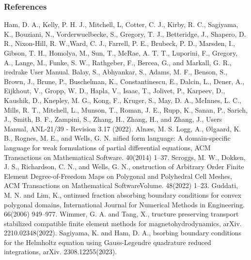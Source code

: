 \documentclass[]{beamer}
\begin{document}
\begin{frame}%
\frametitle{References}
\fontsize{5pt}{5}\selectfont
\begin{thebibliography}{Sagiyam,2013}
Ham, D. A., Kelly, P. H. J., Mitchell, L, Cotter, C. J., Kirby, R. C., Sagiyama, K., Bouziani, N., Vorderwuelbecke, S., Gregory, T. J., Betteridge, J., Shapero, D. R., Nixon-Hill, R. W.,Ward, C. J., Farrell, P. E., Brubeck, P. D., Marsden, I., Gibson, T. H., Homolya, M., Sun, T., McRae, A. T. T., Luporini, F., Gregory, A., Lange, M., Funke, S. W., Rathgeber, F., Bercea, G., and Markall, G. R.,
iredrake {U}ser {M}anual.
Balay, S., Abhyankar, S., Adams, M. F., Benson, S., Brown, J., Brune, P., Buschelman, K., Constantinescu, E., Dalcin, L., Dener, A., Eijkhout, V., Gropp, W. D., Hapla, V., Isaac, T., Jolivet, P., Karpeev, D., Kaushik, D., Knepley, M. G., Kong, F., Kruger, S., May, D. A., McInnes, L. C., Mills, R. T., Mitchell, L., Munson, T., Roman, J. E., Rupp, K., Sanan, P., Sarich, J., Smith, B. F., Zampini, S., Zhang, H., Zhang, H., and Zhang, J.,
 Users Manual,
\newblock ANL-21/39 - Revision 3.17 (2022).
Aln\ae{}s, M. S. Logg, A., \O{}lgaard, K. B., Rognes, M. E., and Wells, G. N.
nified form language: {A} domain-specific language for weak formulations of partial differential equations,
\newblock ACM Transactions on Mathematical Software. 40(2014) 1--37.
Scroggs, M. W., Dokken, J. S., Richardson, C. N., and Wells, G. N.,
onstruction of {A}rbitrary {O}rder {F}inite {E}lement {D}egree-of-{F}reedom {M}aps on {P}olygonal and {P}olyhedral {C}ell {M}eshes,
\newblock ACM Transactions on Mathematical SoftwareVolume. 48(2022) 1--23.
Guddati, M. N. and Lim, K.,
ontinued fraction absorbing boundary conditions for convex polygonal domains,
\newblock International Journal for Numerical Methods in Engineering. 66(2006) 949--977.
Wimmer, G. A. and Tang, X.,
tructure preserving transport stabilized compatible finite element methods for magnetohydrodynamics, 
\newblock arXiv. 2210.02348(2022).
Sagiyama, K. and Ham, D. A.,
bsorbing boundary conditions for the Helmholtz equation using Gauss-Legendre quadrature reduced integrations, 
\newblock arXiv. 2308.12255(2023).
\end{thebibliography}
\end{frame}
\end{document}

